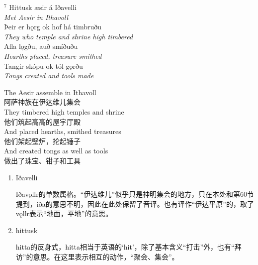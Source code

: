 \begin{paracol}{2}
    \noindent
    $^7 $ Hittusk æsir á Iðavelli\\
    \textit{Met Aesir in Ithavoll}\\
    Þeir er hǫrg ok hof há timbruðu\\
    \textit{They who temple and shrine high timbered}\\
    Afla lǫgðu, auð smíðuðu\\
    \textit{Hearths placed, treasure smithed}\\
    Tangir skópu ok tól gǫrðu\\
    \textit{Tongs created and tools made}\\

    \switchcolumn

    \noindent
    The Aesir assemble in Ithavoll\\
    阿萨神族在伊达维儿集会\\
    They timbered high temples and shrine\\
    他们筑起高高的屋宇厅殿\\
    And placed hearths, smithed treasures\\
    他们架起壁炉，抡起锤子\\
    And created tongs as well as tools\\
    做出了珠宝、钳子和工具\\
\end{paracol}

\begin{grammar*}{}
    \begin{enumerate}[leftmargin=*]
        \item Iðavelli

              Iðav\k{o}llr的单数属格。“伊达维儿”似乎只是神明集会的地方，只在本处和第60节提到，iða的意思不明，因此在此处保留了音译。也有译作“伊达平原”的，取了v\k{o}llr表示“地面，平地”的意思。

        \item hittusk

              hitta的反身式，hitta相当于英语的`hit'，除了基本含义“打击”外，也有“拜访”的意思。在这里表示相互的动作，“聚会、集会”。
    \end{enumerate}
\end{grammar*}
\hspace*{\fill}\\ %

